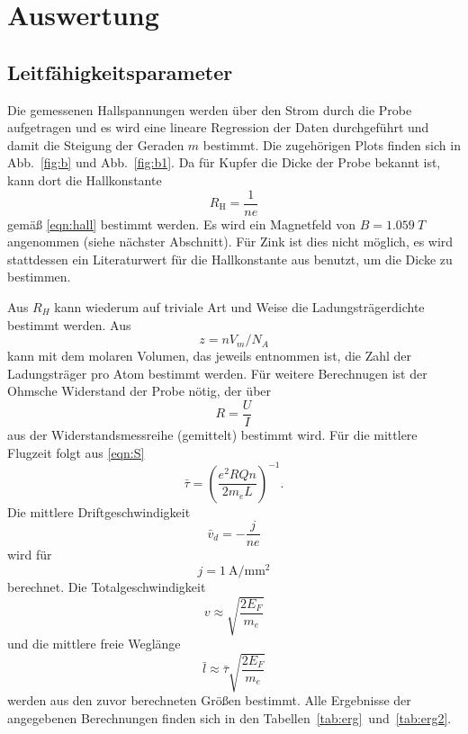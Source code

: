\section{Auswertung}
\label{sec:Auswertung}
\subsection{Leitfähigkeitsparameter}
Die gemessenen Hallspannungen werden über den Strom durch die Probe aufgetragen und es wird eine lineare Regression der Daten durchgeführt und damit die Steigung der Geraden $m$ bestimmt. Die zugehörigen Plots finden sich in Abb.~\ref{fig:b} und Abb.~\ref{fig:b1}. Da für Kupfer die Dicke der Probe bekannt ist, kann dort die Hallkonstante
\begin{equation}
  R_\text{H} = \frac{1}{ne}
\end{equation}
gemäß \eqref{eqn:hall} bestimmt werden. Es wird ein Magnetfeld von $B = \SI{1.059}{T}$ angenommen (siehe nächster Abschnitt). Für Zink ist dies nicht möglich, es wird stattdessen ein Literaturwert für die Hallkonstante aus \cite{zinkhall} benutzt, um die Dicke zu bestimmen.


Aus $R_H$ kann wiederum auf triviale Art und Weise die Ladungsträgerdichte bestimmt werden. Aus
\begin{equation}
  z = n  V_m / N_A
\end{equation}
kann mit dem molaren Volumen, das jeweils \cite{chemie.de} entnommen ist, die Zahl der Ladungsträger pro Atom bestimmt werden. Für weitere Berechnugen ist der Ohmsche Widerstand der Probe nötig, der über
\begin{equation}
  R = \frac{U}{I}
\end{equation}
aus der Widerstandsmessreihe (gemittelt) bestimmt wird. Für die mittlere Flugzeit folgt aus \eqref{eqn:S}
\begin{equation}
  \bar\tau = \left(\frac{e^2 R Q n}{2 m_e L}\right)^{-1}.
\end{equation}
Die mittlere Driftgeschwindigkeit
\begin{equation}
  \bar v_d = -\frac{j}{ne}
\end{equation}
wird für
\begin{equation}
  j = \SI{1}{\ampere\per\milli\meter\squared}
\end{equation}
berechnet.
Die Totalgeschwindigkeit
\begin{equation}
  v \approx \sqrt{\frac{2 E_F}{m_e}}
\end{equation}
und die mittlere freie Weglänge
\begin{equation}
  \bar l \approx \bar \tau \sqrt{\frac{2 E_F}{m_e}}
\end{equation}
werden aus den zuvor berechneten Größen bestimmt. Alle Ergebnisse der angegebenen Berechnungen finden sich in den Tabellen~\ref{tab:erg}~und~\ref{tab:erg2}.



